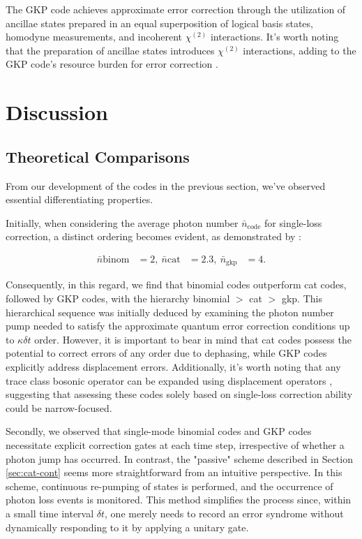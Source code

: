 \documentclass[11pt]{article}
\newcommand\0{\mathbf{0}}
\newcommand\<{\langle}
\renewcommand\>{\rangle}
\begin{document}
The GKP code achieves approximate error correction through the utilization of ancillae states prepared in an equal superposition of logical basis states, homodyne measurements, and incoherent $\chi^{(2)}$ interactions. It's worth noting that the preparation of ancillae states introduces $\chi^{(2)}$ interactions, adding to the GKP code's resource burden for error correction \cite{niu2018hardware}.

\section{Discussion}

\subsection{Theoretical Comparisons}

From our development of the codes in the previous section, we've observed essential differentiating properties.

Initially, when considering the average photon number $\bar{n}_{\text{code}}$ for single-loss correction, a distinct ordering becomes evident, as demonstrated by \cite{michael2016new}:

\begin{align*}
\bar{n}{\text{binom}} &= 2, \
\bar{n}{\text{cat}} &= 2.3, \
\bar{n}_{\text{gkp}} &= 4.
\end{align*}

Consequently, in this regard, we find that binomial codes outperform cat codes, followed by GKP codes, with the hierarchy binomial $>$ cat $>$ gkp. This hierarchical sequence was initially deduced by examining the photon number pump needed to satisfy the approximate quantum error correction conditions up to $\kappa \delta t$ order. However, it is important to bear in mind that cat codes possess the potential to correct errors of any order due to dephasing, while GKP codes explicitly address displacement errors. Additionally, it's worth noting that any trace class bosonic operator can be expanded using displacement operators \cite{albert2017performance}, suggesting that assessing these codes solely based on single-loss correction ability could be narrow-focused.

Secondly, we observed that single-mode binomial codes and GKP codes necessitate explicit correction gates at each time step, irrespective of whether a photon jump has occurred. In contrast, the "passive" scheme described in Section \ref{sec:cat-cont} seems more straightforward from an intuitive perspective. In this scheme, continuous re-pumping of states is performed, and the occurrence of photon loss events is monitored. This method simplifies the process since, within a small time interval $\delta t$, one merely needs to record an error syndrome without dynamically responding to it by applying a unitary gate.
\end{document}
